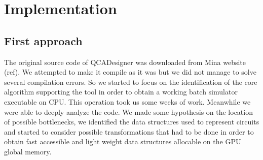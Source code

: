 \chapter{Implementation}\label{sec:implementation}
\section{First approach}
The original source code of QCADesigner was downloaded from Mina website (ref). We attempted to make it compile as it was but we did not
manage to solve several compilation errors. So we started to focus on the identification of the core algorithm supporting the tool in
order to obtain a working batch simulator executable on CPU. This operation took us some weeks of work. Meanwhile we were able to deeply
analyze the code. We made some hypothesis on the location of possible bottlenecks, we identified the data structures used to represent 
circuits and started to consider possible transformations that had to be done in order to obtain fast accessible and light weight data 
structures allocable on the GPU global memory.

